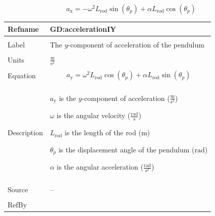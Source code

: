 \documentclass[12pt]{article}
\begin{document}
\begin{displaymath}
{a_{\text{x}}}=-ω^{2} {L_{\text{rod}}} \sin\left({θ_{p}}\right)+α {L_{\text{rod}}} \cos\left({θ_{p}}\right)
\end{displaymath}
\vspace{\baselineskip}
\noindent
\begin{minipage}{\textwidth}
\begin{tabular}{>{\raggedright}p{}>{\raggedright\arraybackslash}p{}}
\toprule \textbf{Refname} & \textbf{GD:accelerationIY}
\label{GD:accelerationIY}
\\ \midrule \\
Label & The $y$-component of acceleration of the pendulum
        
\\ \midrule \\
Units & $\frac{\text{m}}{\text{s}^{2}}$
        
\\ \midrule \\
Equation & \begin{displaymath}
           {a_{\text{y}}}=ω^{2} {L_{\text{rod}}} \cos\left({θ_{p}}\right)+α {L_{\text{rod}}} \sin\left({θ_{p}}\right)
           \end{displaymath}
\\ \midrule \\
Description & \begin{symbDescription}
              \item{${a_{\text{y}}}$ is the $y$-component of acceleration ($\frac{\text{m}}{\text{s}^{2}}$)}
              \item{$ω$ is the angular velocity ($\frac{\text{rad}}{\text{s}}$)}
              \item{${L_{\text{rod}}}$ is the length of the rod (${\text{m}}$)}
              \item{${θ_{p}}$ is the displacement angle of the pendulum (${\text{rad}}$)}
              \item{$α$ is the angular acceleration ($\frac{\text{rad}}{\text{s}^{2}}$)}
              \end{symbDescription}
\\ \midrule \\
Source & --
         
\\ \midrule \\
RefBy & 
\\ \bottomrule
\end{tabular}
\end{minipage}
\end{document}
